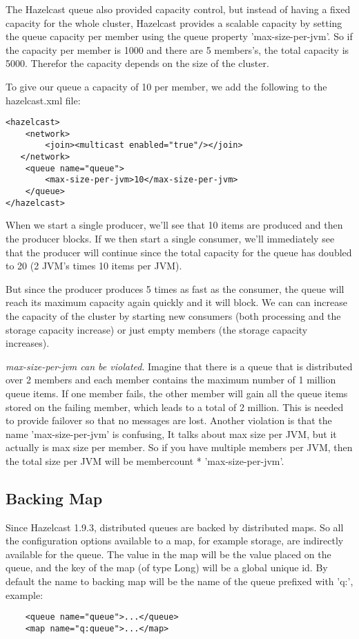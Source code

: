 The Hazelcast queue also provided capacity control, but instead of having a fixed capacity for the whole cluster, Hazelcast provides a scalable capacity by setting the queue capacity per member using the queue property 'max-size-per-jvm'. So if the capacity per member is 1000 and there are 5 members's, the total capacity is 5000. Therefor the capacity depends on the size of the cluster.

To give our queue a capacity of 10 per member, we add the following to the hazelcast.xml file:
\begin{lstlisting}
<hazelcast>
    <network>
        <join><multicast enabled="true"/></join>
   </network>
    <queue name="queue">
        <max-size-per-jvm>10</max-size-per-jvm>
    </queue>
</hazelcast>
\end{lstlisting}
When we start a single producer, we'll see that 10 items are produced and then the producer blocks. If we then start a single consumer, we'll immediately see that the producer will continue since the total capacity for the queue has doubled to 20 (2 JVM's times 10 items per JVM). 

But since the producer produces 5 times as fast as the consumer, the queue will reach its maximum capacity again quickly and it will block. We can can increase the capacity of the cluster by starting new consumers (both processing and the storage capacity increase) or just empty members (the storage capacity increases).

\emph{max-size-per-jvm can be violated}. Imagine that there is a queue that is distributed over 2 members and each member contains the maximum number of 1 million queue items. If one member fails, the other member will gain all the queue items stored on the failing member, which leads to a total of 2 million. This is needed to provide failover so that no messages are lost. Another violation is that the name 'max-size-per-jvm' is confusing, It talks about max size per JVM, but it actually is max size per member. So if you have multiple members per JVM, then the total size per JVM will be membercount * 'max-size-per-jvm'.

\subsection{Backing Map}
Since Hazelcast 1.9.3, distributed queues are backed by distributed maps. So all the configuration options available to a map, for example storage, are indirectly available for the queue. The value in the map will be the value placed on the queue, and the key of the map (of type Long) will be a global unique id. By default the name to backing map will be the name of the queue prefixed with 'q:', example:
\begin{lstlisting}
    <queue name="queue">...</queue>
    <map name="q:queue">...</map>
\end{lstlisting}

